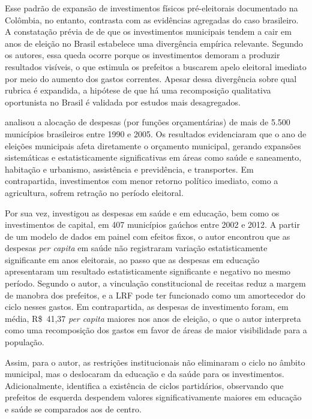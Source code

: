 Esse padrão de expansão de investimentos físicos pré-eleitorais documentado na Colômbia, no entanto, contrasta com as evidências agregadas do caso brasileiro. A constatação prévia de \textcite{sakurai2011} de que os investimentos municipais tendem a cair em anos de eleição no Brasil estabelece uma divergência empírica relevante. Segundo os autores, essa queda ocorre porque os investimentos demoram a produzir resultados visíveis, o que estimula os prefeitos a buscarem apelo eleitoral imediato por meio do aumento dos gastos correntes. Apesar dessa divergência sobre qual rubrica é expandida, a hipótese de que há uma recomposição qualitativa oportunista no Brasil é validada por estudos mais desagregados.

\textcite{sakurai2009} analisou a alocação de despesas (por funções orçamentárias) de mais de 5.500 municípios brasileiros entre 1990 e 2005. Os resultados evidenciaram que o ano de eleições municipais afeta diretamente o orçamento municipal, gerando expansões sistemáticas e estatisticamente significativas em áreas como saúde e saneamento, habitação e urbanismo, assistência e previdência, e transportes. Em contrapartida, investimentos com menor retorno político imediato, como a agricultura, sofrem retração no período eleitoral.

Por sua vez, \textcite{nunes2017} investigou as despesas em saúde e em educação, bem como os investimentos de capital, em 407 municípios gaúchos entre 2002 e 2012. A partir de um modelo de dados em painel com efeitos fixos, o autor encontrou que as despesas \textit{per capita} em saúde não registraram variação estatisticamente significante em anos eleitorais, ao passo que as despesas em educação apresentaram um resultado estatisticamente significante e negativo no mesmo período. Segundo o autor, a vinculação constitucional de receitas reduz a margem de manobra dos prefeitos, e a LRF pode ter funcionado como um amortecedor do ciclo nesses gastos. Em contrapartida, as despesas de investimento foram, em média, R\$~41,37 \textit{per capita} maiores nos anos de eleição, o que o autor interpreta como uma recomposição dos gastos em favor de áreas de maior visibilidade para a população.

Assim, para o autor, as restrições institucionais não eliminaram o ciclo no âmbito municipal, mas o deslocaram da educação e da saúde para os investimentos. Adicionalmente, \textcite{nunes2017} identifica a existência de ciclos partidários, observando que prefeitos de esquerda despendem valores significativamente maiores em educação e saúde se comparados aos de centro.

